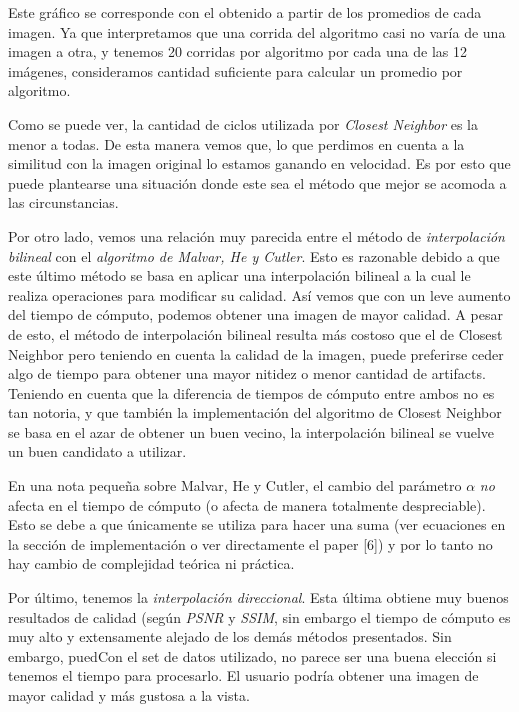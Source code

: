 \begin{itemize}
Este gráfico se corresponde con el obtenido a partir de los promedios de cada imagen. Ya que interpretamos que una corrida del algoritmo casi no varía de una imagen a otra, y tenemos 20 corridas por algoritmo por cada una de las 12 imágenes, consideramos cantidad suficiente para calcular un promedio por algoritmo.

\vspace{\baselineskip}

Como se puede ver, la cantidad de ciclos utilizada por \textit{Closest Neighbor} es la menor a todas. De esta manera vemos que, lo que perdimos en cuenta a la similitud con la imagen original lo estamos ganando en velocidad. Es por esto que puede plantearse una situación donde este sea el método que mejor se acomoda a las circunstancias. 

\vspace{\baselineskip}

Por otro lado, vemos una relación muy parecida entre el método de \textit{interpolación bilineal} con el \textit{algoritmo de Malvar, He y Cutler}. Esto es razonable debido a que este último método se basa en aplicar una interpolación bilineal a la cual le realiza operaciones para modificar su calidad. Así vemos que con un leve aumento del tiempo de cómputo, podemos obtener una imagen de mayor calidad. A pesar de esto, el método de interpolación bilineal resulta más costoso que el de Closest Neighbor pero teniendo en cuenta la calidad de la imagen, puede preferirse ceder algo de tiempo para obtener una mayor nitidez o menor cantidad de artifacts. Teniendo en cuenta que la diferencia de tiempos de cómputo entre ambos no es tan notoria, y que también la implementación del algoritmo de Closest Neighbor se basa en el azar de obtener un buen vecino, la interpolación bilineal se vuelve un buen candidato a utilizar.

En una nota pequeña sobre Malvar, He y Cutler, el cambio del parámetro $\alpha$ \textit{no} afecta en el tiempo de cómputo (o afecta de manera totalmente despreciable). Esto se debe a que únicamente se utiliza para hacer una suma (ver ecuaciones en la sección de implementación o ver directamente el paper [6]) y por lo tanto no hay cambio de complejidad teórica ni práctica.

\vspace{\baselineskip}

Por último, tenemos la \textit{interpolación direccional}. Esta última obtiene muy buenos resultados de calidad (según \textit{PSNR} y \textit{SSIM}, sin embargo el tiempo de cómputo es muy alto y extensamente alejado de los demás métodos presentados.
Sin embargo, puedCon el set de datos utilizado, no parece ser una buena elección si tenemos el tiempo para procesarlo. El usuario podría obtener una imagen de mayor calidad y más gustosa a la vista. 


\end{itemize}

